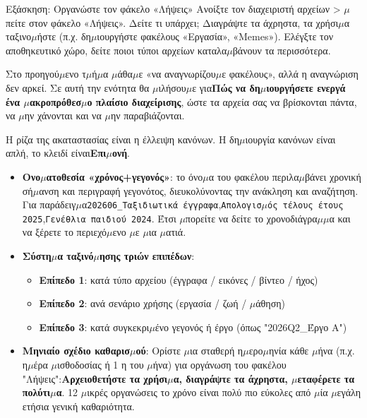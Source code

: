 \begin{tcbpractice}{Εξάσκηση: Οργανώστε τον φάκελο «Λήψεις»}
Ανοίξτε τον διαχειριστή αρχείων > $\mu$πείτε στον φάκελο «Λήψεις». Δείτε τι υπάρχει; Διαγράψτε τα άχρηστα, τα χρήσι$\mu$α ταξινο$\mu$ήστε (π.χ. δη$\mu$ιουργήστε φακέλους «Εργασία», «Memes»). Ελέγξτε τον αποθηκευτικό χώρο, δείτε ποιοι τύποι αρχείων καταλα$\mu$βάνουν τα περισσότερα.

\end{tcbpractice}


Στο προηγού$\mu$ενο τ$\mu$ή$\mu$α $\mu$άθα$\mu$ε «να αναγνωρίζου$\mu$ε φακέλους», αλλά η αναγνώριση δεν αρκεί. Σε αυτή την ενότητα θα $\mu$ιλήσου$\mu$ε για\textbf{Πώς να δη$\mu$ιουργήσετε ενεργά ένα $\mu$ακροπρόθεσ$\mu$ο πλαίσιο διαχείρισης}, ώστε τα αρχεία σας να βρίσκονται πάντα, να $\mu$ην χάνονται και να $\mu$ην παραβιάζονται.


Η ρίζα της ακαταστασίας είναι η έλλειψη κανόνων. Η δη$\mu$ιουργία κανόνων είναι απλή, το κλειδί είναι\textbf{Επι$\mu$ονή}.

\begin{itemize}
  \item \textbf{Ονο$\mu$ατοθεσία «χρόνος+γεγονός»}: το όνο$\mu$α του φακέλου περιλα$\mu$βάνει χρονική σή$\mu$ανση και περιγραφή γεγονότος, διευκολύνοντας την ανάκληση και αναζήτηση. Για παράδειγ$\mu$α\texttt{202606\_Ταξιδιωτικά έγγραφα},\texttt{Απολογισ$\mu$ός τέλους έτους 2025},\texttt{Γενέθλια παιδιού 2024}. Έτσι $\mu$πορείτε να δείτε το χρονοδιάγρα$\mu$$\mu$α και να ξέρετε το περιεχό$\mu$ενο $\mu$ε $\mu$ια $\mu$ατιά.
  \item \textbf{Σύστη$\mu$α ταξινό$\mu$ησης τριών επιπέδων}:
  \begin{itemize}
    \item \textbf{Επίπεδο 1}: κατά τύπο αρχείου (έγγραφα / εικόνες / βίντεο / ήχος)
    \item \textbf{Επίπεδο 2}: ανά σενάριο χρήσης (εργασία / ζωή / $\mu$άθηση)
    \item \textbf{Επίπεδο 3}: κατά συγκεκρι$\mu$ένο γεγονός ή έργο (όπως "2026Q2\_Έργο A")
  \end{itemize}
  \item \textbf{Μηνιαίο σχέδιο καθαρισ$\mu$ού}: Ορίστε $\mu$ια σταθερή η$\mu$ερο$\mu$ηνία κάθε $\mu$ήνα (π.χ. η$\mu$έρα $\mu$ισθοδοσίας ή 1 η του $\mu$ήνα) για οργάνωση του φακέλου "Λήψεις":\textbf{Αρχειοθετήστε τα χρήσι$\mu$α, διαγράψτε τα άχρηστα, $\mu$εταφέρετε τα πολύτι$\mu$α}. 12 $\mu$ικρές οργανώσεις το χρόνο είναι πολύ πιο εύκολες από $\mu$ία $\mu$εγάλη ετήσια γενική καθαριότητα.
\end{itemize}


